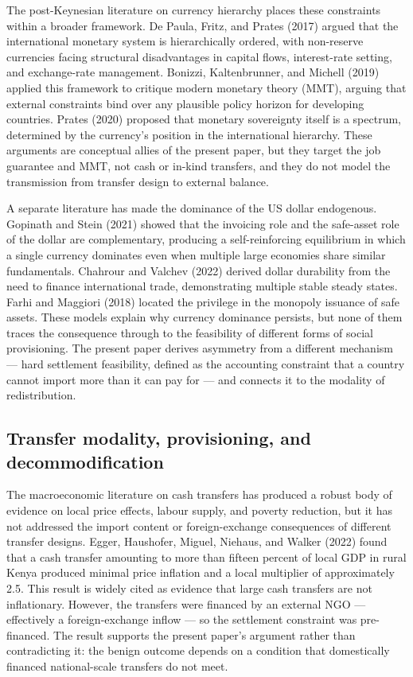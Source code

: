 \documentclass[preprint,review,12pt]{elsarticle}
\begin{document}
The post-Keynesian literature on currency hierarchy places these
constraints within a broader framework. De Paula, Fritz, and Prates
(2017) argued that the international monetary system is hierarchically
ordered, with non-reserve currencies facing structural disadvantages in
capital flows, interest-rate setting, and exchange-rate management.
Bonizzi, Kaltenbrunner, and Michell (2019) applied this framework to
critique modern monetary theory (MMT), arguing that external constraints
bind over any plausible policy horizon for developing countries. Prates
(2020) proposed that monetary sovereignty itself is a spectrum,
determined by the currency's position in the international hierarchy.
These arguments are conceptual allies of the present paper, but they
target the job guarantee and MMT, not cash or in-kind transfers, and
they do not model the transmission from transfer design to external
balance.

A separate literature has made the dominance of the US dollar
endogenous. Gopinath and Stein (2021) showed that the invoicing role and
the safe-asset role of the dollar are complementary, producing a
self-reinforcing equilibrium in which a single currency dominates even
when multiple large economies share similar fundamentals. Chahrour and
Valchev (2022) derived dollar durability from the need to finance
international trade, demonstrating multiple stable steady states. Farhi
and Maggiori (2018) located the privilege in the monopoly issuance of
safe assets. These models explain why currency dominance persists, but
none of them traces the consequence through to the feasibility of
different forms of social provisioning. The present paper derives
asymmetry from a different mechanism --- hard settlement feasibility,
defined as the accounting constraint that a country cannot import more
than it can pay for --- and connects it to the modality of
redistribution.

\subsection{Transfer modality, provisioning, and decommodification}

The macroeconomic literature on cash transfers has produced a robust
body of evidence on local price effects, labour supply, and poverty
reduction, but it has not addressed the import content or
foreign-exchange consequences of different transfer designs. Egger,
Haushofer, Miguel, Niehaus, and Walker (2022) found that a cash transfer
amounting to more than fifteen percent of local GDP in rural Kenya
produced minimal price inflation and a local multiplier of approximately
2.5. This result is widely cited as evidence that large cash transfers
are not inflationary. However, the transfers were financed by an
external NGO --- effectively a foreign-exchange inflow --- so the
settlement constraint was pre-financed. The result supports the present
paper's argument rather than contradicting it: the benign outcome
depends on a condition that domestically financed national-scale
transfers do not meet.
\end{document}
